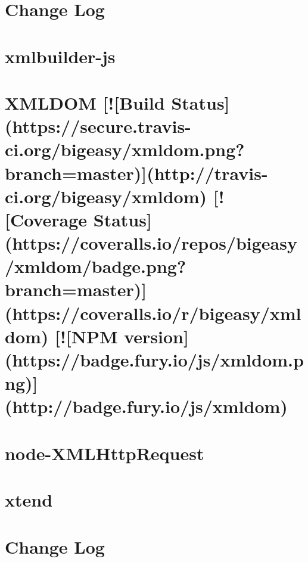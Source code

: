 \documentclass[twoside]{book}
\newcommand{\+}{\discretionary{\mbox{\scriptsize$\hookleftarrow$}}{}{}}
\begin{document}
\chapter{Change Log}
\label{md_dsmacc_examples_DRmerge_node_modules_xmlbuilder_CHANGELOG}

\chapter{xmlbuilder-\/js}
\label{md_dsmacc_examples_DRmerge_node_modules_xmlbuilder_README}

\chapter{X\+M\+L\+D\+OM \mbox{[}!\mbox{[}Build Status\mbox{]}(https\+://secure.travis-\/ci.org/bigeasy/xmldom.png?branch=master)\mbox{]}(http\+://travis-\/ci.org/bigeasy/xmldom) \mbox{[}!\mbox{[}Coverage Status\mbox{]}(https\+://coveralls.io/repos/bigeasy/xmldom/badge.png?branch=master)\mbox{]}(https\+://coveralls.io/r/bigeasy/xmldom) \mbox{[}!\mbox{[}N\+PM version\mbox{]}(https\+://badge.fury.\+io/js/xmldom.png)\mbox{]}(http\+://badge.fury.\+io/js/xmldom)}
\label{md_dsmacc_examples_DRmerge_node_modules_xmldom_readme}

\chapter{node-\/\+X\+M\+L\+Http\+Request}
\label{md_dsmacc_examples_DRmerge_node_modules_xmlhttprequest_README}

\chapter{xtend}
\label{md_dsmacc_examples_DRmerge_node_modules_xtend_README}

\chapter{Change Log}
\label{md_dsmacc_examples_DRmerge_node_modules_y18n_CHANGELOG}

\end{document}
